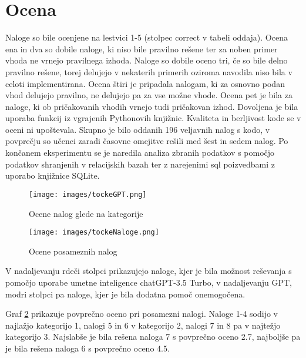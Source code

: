 \documentclass[a4paper,12pt,openright]{book}
\begin{document}
\section{Ocena}
Naloge so bile ocenjene na lestvici 1-5 (stolpec correct v tabeli oddaja). Ocena ena in dva so dobile naloge, ki niso bile pravilno rešene ter za noben primer vhoda ne vrnejo pravilnega izhoda. Naloge so dobile oceno tri, če so bile delno pravilno rešene, torej delujejo v nekaterih primerih oziroma navodila niso bila v celoti implementirana. Ocena štiri je pripadala nalogam, ki za osnovno podan vhod delujejo pravilno, ne delujejo pa za vse možne vhode. Ocena pet je bila za naloge, ki ob pričakovanih vhodih vrnejo tudi pričakovan izhod. Dovoljena je bila uporaba funkcij iz vgrajenih Pythonovih knjižnic. Kvaliteta in berljivost kode se v oceni ni upoštevala. Skupno je bilo oddanih 196 veljavnih nalog s kodo, v povprečju so učenci zaradi časovne omejitve rešili med šest in sedem nalog. 
Po končanem eksperimentu se je naredila analiza zbranih podatkov s pomočjo podatkov shranjenih v relacijskih bazah ter z narejenimi sql poizvedbami z uporabo knjižnice SQLite.

\begin{figure}[H]
    \centering
    \texttt{[image: images/tockeGPT.png]}
    \caption{Ocene nalog glede na kategorije}
    \label{fig:bar_all}
\end{figure}

\begin{figure}[H]
    \centering
    \texttt{[image: images/tockeNaloge.png]}
    \caption{Ocene posameznih nalog}
    \label{fig:grade_all}
\end{figure}
 V nadaljevanju rdeči stolpci prikazujejo naloge, kjer je bila možnost reševanja s pomočjo uporabe umetne inteligence chatGPT-3.5 Turbo, v nadaljevanju GPT, modri stolpci pa naloge, kjer je bila dodatna pomoč onemogočena.

Graf \ref{fig:grade_all} prikazuje povprečno oceno pri posamezni nalogi. Naloge 1-4 sodijo v najlažjo kategorijo 1, nalogi 5 in 6 v kategorijo 2, nalogi 7 in 8 pa v najtežjo kategorijo 3. Najslabše je bila rešena naloga 7 s povprečno oceno 2.7, najboljše pa je bila rešena naloga 6 s povprečno oceno 4.5.
\end{document}
